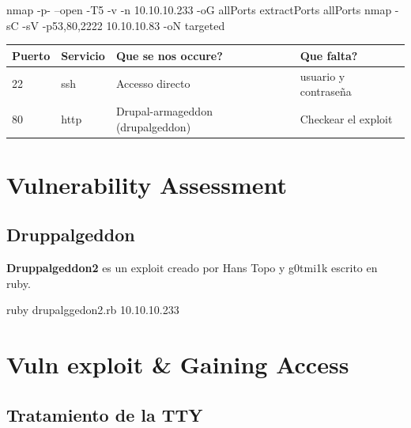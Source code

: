 \documentclass{assets/ipesethesis}
\newenvironment{Shaded}{\begin{snugshade}}{\end{snugshade}}
\newcommand{\ExtensionTok}[1]{#1}
\newcommand{\FunctionTok}[1]{\textcolor[rgb]{0.00,0.00,0.00}{#1}}
\newcommand{\NormalTok}[1]{#1}
\begin{document}
\begin{Shaded}
\begin{Highlighting}[]
\FunctionTok{nmap}\NormalTok{ -p- --open -T5 -v -n 10.10.10.233 -oG allPorts}
\ExtensionTok{extractPorts}\NormalTok{ allPorts}
\FunctionTok{nmap}\NormalTok{ -sC -sV -p53,80,2222 10.10.10.83 -oN targeted}
\end{Highlighting}
\end{Shaded}

\begin{longtable}[]{@{}llll@{}}
\toprule
Puerto & Servicio & Que se nos occure? & Que falta?\tabularnewline
\midrule
\endhead
22 & ssh & Accesso directo & usuario y contraseña\tabularnewline
80 & http & Drupal-armageddon (drupalgeddon) & Checkear el exploit\tabularnewline
\bottomrule
\end{longtable}

\hypertarget{vulnerability-assessment-2}{%
\section*{Vulnerability Assessment}\label{vulnerability-assessment-2}}

\hypertarget{druppalgeddon}{%
\subsection*{Druppalgeddon}\label{druppalgeddon}}

\textbf{Druppalgeddon2} es un exploit creado por Hans Topo y g0tmi1k escrito en ruby.

\begin{Shaded}
\begin{Highlighting}[]
\ExtensionTok{ruby}\NormalTok{ drupalggedon2.rb 10.10.10.233}
\end{Highlighting}
\end{Shaded}

\hypertarget{vuln-exploit-gaining-access-2}{%
\section*{Vuln exploit \& Gaining Access}\label{vuln-exploit-gaining-access-2}}

\hypertarget{tratamiento-de-la-tty-2}{%
\subsection*{Tratamiento de la TTY}\label{tratamiento-de-la-tty-2}}
\end{document}
